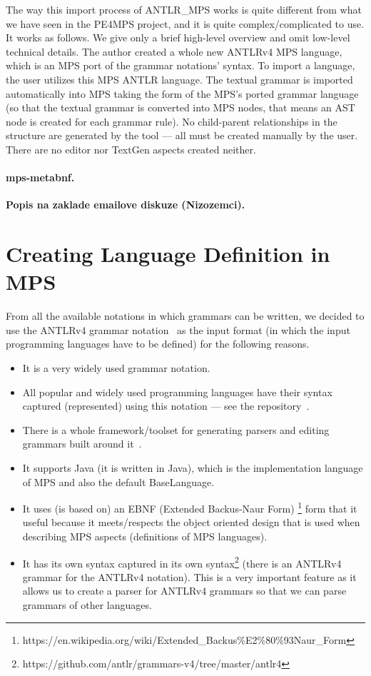 \documentclass[10pt]{sigplanconf}
\newcommand{\todo}[1]{{\bfseries #1}}
\begin{document}
The way this import process of ANTLR{\_}MPS works is quite different from what we have seen in the PE4MPS project, and it is quite complex/complicated to use.
It works as follows. We give only a brief high-level overview and omit low-level technical details.
The author created a whole new ANTLRv4 MPS language, which is an MPS port of the grammar notations' syntax.
To import a language, the user utilizes this MPS ANTLR language.
The textual grammar is imported automatically into MPS taking the form of the MPS's ported grammar language (so that the textual grammar is converted into MPS nodes, that means an AST node is created for each grammar rule).
No child-parent relationships in the structure are generated by the tool --- all must be created manually by the user.
There are no editor nor TextGen aspects created neither.

\paragraph{mps-metabnf.}
\todo{Popis na zaklade emailove diskuze (Nizozemci).}


\section{Creating Language Definition in MPS}

From all the available notations in which grammars can be written, we decided to use the ANTLRv4 grammar notation~\cite{ANTLR4reference} as the input format (in which the input programming languages have to be defined) for the following reasons.
\begin{itemize}
	\item It is a very widely used grammar notation.
	\item All popular and widely used programming languages have their syntax captured (represented) using this notation --- see the repository~\cite{ref:ANTLR4grammars}.
	\item There is a whole framework/toolset for generating parsers and editing grammars built around it~\cite{ref:ANTLR4}.
	\item It supports Java (it is written in Java), which is the implementation language of MPS and also the default BaseLanguage.
	\item It uses (is based on) an EBNF (Extended Backus-Naur Form) \footnote{https://en.wikipedia.org/wiki/Extended{\_}Backus\%E2\%80\%93Naur{\_}Form} form that it useful because it meets/respects the object oriented design that is used when describing MPS aspects (definitions of MPS languages).
	\item It has its own syntax captured in its own syntax\footnote{https://github.com/antlr/grammars-v4/tree/master/antlr4} (there is an ANTLRv4 grammar for the ANTLRv4 notation). This is a very important feature as it allows us to create a parser for ANTLRv4 grammars so that we can parse grammars of other languages.
\end{itemize}
\end{document}
